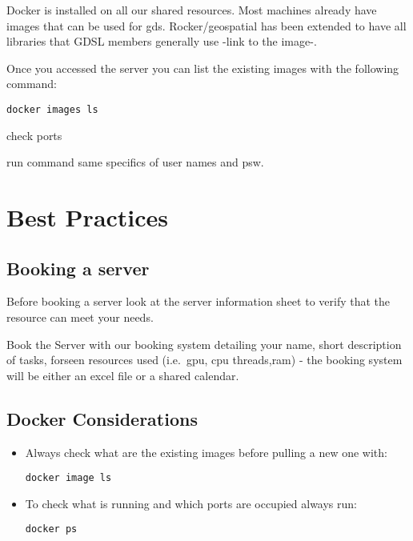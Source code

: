 \documentclass[
]{book}
\begin{document}
Docker is installed on all our shared resources. Most machines already have images that can be used for gds. Rocker/geospatial has been extended to have all libraries that GDSL members generally use -link to the image-.

Once you accessed the server you can list the existing images with the following command:

\begin{verbatim}
docker images ls
\end{verbatim}

check ports

run command same specifics of user names and psw.

\hypertarget{best-practices}{%
\chapter{Best Practices}\label{best-practices}}

\hypertarget{booking-a-server}{%
\section{Booking a server}\label{booking-a-server}}

Before booking a server look at the server information sheet to verify that the resource can meet your needs.

Book the Server with our booking system detailing your name, short description of tasks, forseen resources used (i.e.~gpu, cpu threads,ram) - the booking system will be either an excel file or a shared calendar.

\hypertarget{docker-considerations}{%
\section{Docker Considerations}\label{docker-considerations}}

\begin{itemize}
\item
  Always check what are the existing images before pulling a new one with:

\begin{verbatim}
docker image ls
\end{verbatim}
\item
  To check what is running and which ports are occupied always run:

\begin{verbatim}
docker ps 
\end{verbatim}
\end{itemize}
\end{document}
